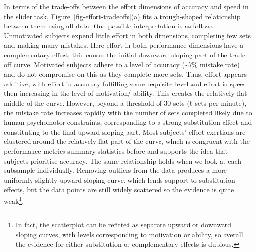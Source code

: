 \documentclass[
  12,
  letterpaper,
  DIV=11,
  numbers=noendperiod]{scrartcl}
\begin{document}
In terms of the trade-offs between the effort dimensions of accuracy and
speed in the slider task, Figure~\ref{fig-effort-tradeoffs}(a) fits a
trough-shaped relationship between them using all data. One possible
interpretation is as follows. Unmotivated subjects expend little effort
in both dimensions, completing few sets and making many mistakes. Here
effort in both performance dimensions have a complementary effect; this
causes the initial downward sloping part of the trade-off curve.
Motivated subjects adhere to a level of accuracy (\textasciitilde7\%
mistake rate) and do not compromise on this as they complete more sets.
Thus, effort appears additive, with effort in accuracy fulfilling some
requisite level and effort in speed then increasing in the level of
motivation/ ability. This creates the relatively flat middle of the
curve. However, beyond a threshold of 30 sets (6 sets per minute), the
mistake rate increases rapidly with the number of sets completed likely
due to human psychomotor constraints, corresponding to a strong
substitution effect and constituting to the final upward sloping part.
Most subjects' effort exertions are clustered around the relatively flat
part of the curve, which is congruent with the performance metrics
summary statistics before and supports the idea that subjects prioritise
accuracy. The same relationship holds when we look at each subsample
individually. Removing outliers from the data produces a more uniformly
slightly upward sloping curve, which lends support to substitution
effects, but the data points are still widely scattered so the evidence
is quite weak\footnote{In fact, the scatterplot can be refitted as
  separate upward or downward sloping curves, with levels corresponding
  to motivation or ability, so overall the evidence for either
  substitution or complementary effects is dubious.}.
\end{document}

